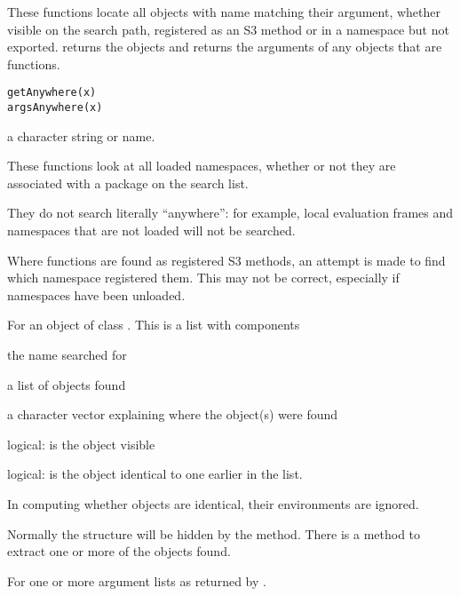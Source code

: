 \aliasA{[.getAnywhere}{getAnywhere}{[.getAnywhere}
%
\begin{Description}\relax
These functions locate all objects with name matching their argument,
whether visible on the search path, registered as an S3 method or in a
namespace but not exported.   returns the objects
and  returns the arguments of any objects that
are functions.
\end{Description}
%
\begin{Usage}
\begin{verbatim}
getAnywhere(x)
argsAnywhere(x)
\end{verbatim}
\end{Usage}
%
\begin{Arguments}
\begin{ldescription}
\item[\code{x}] a character string or name.
\end{ldescription}
\end{Arguments}
%
\begin{Details}\relax
These functions look at all loaded namespaces, whether or not they are
associated with a package on the search list.  

They do not search literally ``anywhere'': for example, local
evaluation frames and namespaces that are not loaded will not be
searched.

Where functions are found as registered S3 methods, an attempt is
made to find which namespace registered them.  This may not be
correct, especially if namespaces have been unloaded.
\end{Details}
%
\begin{Value}
For  an object of class .
This is a list with components
\begin{ldescription}
\item[\code{name}] the name searched for
\item[\code{objs}] a list of objects found
\item[\code{where}] a character vector explaining where the object(s) were found
\item[\code{visible}] logical: is the object visible
\item[\code{dups}] logical: is the object identical to one earlier in the
list.
\end{ldescription}
In computing whether objects are identical, their environments are ignored.

Normally the structure will be hidden by the  method.
There is a \code{[} method to extract one or more of the objects
found.

For  one or more argument lists as returned by
.
\end{Value}
